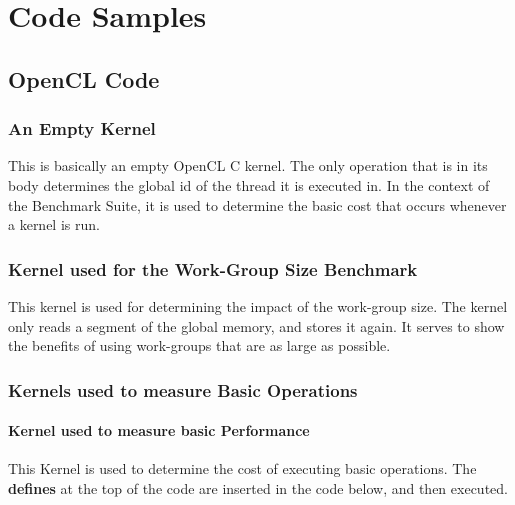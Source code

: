 
\chapter{Code Samples}
\section{OpenCL Code}
\label{sect:appendix_opencl}
\subsection{An Empty Kernel}
\label{sect:appendix_opencl_empty}
This is basically an empty OpenCL C kernel. The only operation that is in its body determines the global id of the thread it is executed in. In the context of the Benchmark Suite, it is used to determine the basic cost that occurs whenever a kernel is run.\\



\subsection{Kernel used for the Work-Group Size Benchmark}
\label{sect:appendix_opencl_wg}
This kernel is used for determining the impact of the work-group size. The kernel only reads a segment of the global memory, and stores it again. It serves to show the benefits of using work-groups that are as large as possible. \\



\subsection{Kernels used to measure Basic Operations}
\label{sect:appendix_opencl_ops}
\subsubsection{Kernel used to measure basic Performance}
\label{sect:appendix_opencl_ops_single}
This Kernel is used to determine the cost of executing basic operations. The \textbf{defines} at the top of the code are inserted in the code below, and then executed. \\

